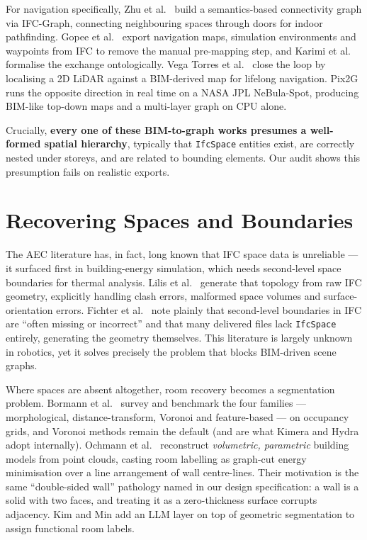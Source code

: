 \documentclass[10pt,twocolumn,letterpaper]{article}
\begin{document}
For navigation specifically, Zhu et al.\ \cite{zhu2025ifcgraph} build a
semantics-based connectivity graph via IFC-Graph, connecting neighbouring spaces
through doors for indoor pathfinding. Gopee et al.\ \cite{gopee2023ifcnav} export
navigation maps, simulation environments and waypoints from IFC to remove the
manual pre-mapping step, and Karimi et al.\ \cite{karimi2021ontology} formalise
the exchange ontologically. Vega Torres et al.\ \cite{vegatorres2023bimlidar}
close the loop by localising a 2D LiDAR against a BIM-derived map for lifelong
navigation. Pix2G \cite{longo2025pix2g} runs the opposite direction in real time
on a NASA JPL NeBula-Spot, producing BIM-like top-down maps and a multi-layer
graph on CPU alone.

Crucially, \textbf{every one of these BIM-to-graph works presumes a
well-formed spatial hierarchy}, typically that \texttt{IfcSpace} entities exist,
are correctly nested under storeys, and are related to bounding elements. Our
audit shows this presumption fails on realistic exports.

\section{Recovering Spaces and Boundaries}
\label{sec:rooms}

The AEC literature has, in fact, long known that IFC space data is unreliable ---
it surfaced first in building-energy simulation, which needs second-level space
boundaries for thermal analysis. Lilis et al.\ \cite{lilis2017spaceboundary}
generate that topology from raw IFC geometry, explicitly handling clash errors,
malformed space volumes and surface-orientation errors. Fichter et al.\
\cite{fichter2021spaceboundary} note plainly that second-level boundaries in IFC
are ``often missing or incorrect'' and that many delivered files lack
\texttt{IfcSpace} entirely, generating the geometry themselves. This literature
is largely unknown in robotics, yet it solves precisely the problem that blocks
BIM-driven scene graphs.

Where spaces are absent altogether, room recovery becomes a segmentation problem.
Bormann et al.\ \cite{bormann2016roomseg} survey and benchmark the four families
--- morphological, distance-transform, Voronoi and feature-based --- on occupancy
grids, and Voronoi methods remain the default (and are what Kimera and Hydra
adopt internally). Ochmann et al.\ \cite{ochmann2016parametric} reconstruct
\emph{volumetric, parametric} building models from point clouds, casting room
labelling as graph-cut energy minimisation over a line arrangement of wall
centre-lines. Their motivation is the same ``double-sided wall'' pathology named
in our design specification: a wall is a solid with two faces, and treating it as
a zero-thickness surface corrupts adjacency. Kim and Min
\cite{kim2024semanticlayering} add an LLM layer on top of geometric segmentation
to assign functional room labels.
\end{document}
